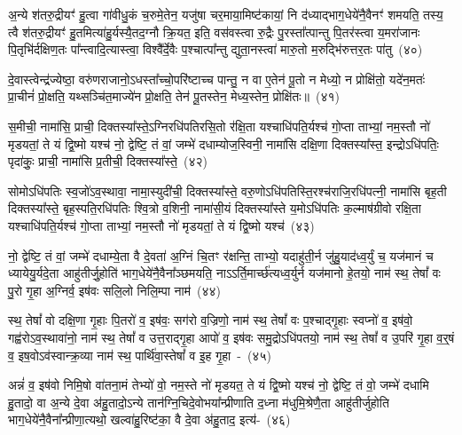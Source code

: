 अ॒न्ये श॑तरु॒द्रीयꣳ॑ हु॒त्वा गा॑वीधु॒कं च॒रुमे॒तेन॒ यजु॑षा चर॒माया॒मिष्ट॑कायां॒ नि द॑ध्याद्भाग॒\-धेये॑नै॒वैनꣳ॑ शमयति॒ तस्य॒ त्वै श॑तरु॒द्रीयꣳ॑ हु॒तमित्या॑हु॒र्यस्यै॒तद॒ग्नौ क्रि॒यत॒ इति॒ वस॑वस्त्वा रु॒द्रैः पु॒रस्ता᳚त्पान्तु पि॒तर॑स्त्वा य॒मरा॑जानः पि॒तृभि॑र्दक्षिण॒तः पा᳚न्त्वादि॒त्यास्त्वा॒ विश्वै᳚र्दे॒वैः प॒श्चात्पा᳚न्तु द्युता॒नस्त्वा॑ मारु॒तो म॒रुद्भि॑रुत्तर॒तः पा॑तु~(४०)\ip

दे॒वास्त्वेन्द्र॑ज्येष्ठा॒ वरु॑णराजानो॒\-ऽधस्ता᳚च्चो॒परि॑ष्टाच्च पान्तु॒ न वा ए॒तेन॑ पू॒तो न मेध्यो॒ न प्रोक्षि॑तो॒ यदे॑न॒मतः॑ प्रा॒चीनं॑ प्रो॒क्षति॒ यथ्सञ्चि॑त॒माज्ये॑न प्रो॒क्षति॒ तेन॑ पू॒तस्तेन॒ मेध्य॒स्तेन॒ प्रोक्षि॑तः॥~(४१)\ip

{\anuvakamend[{दु॒ध्रस्त॒नूर्\mbox{}ह॒विर्भा॑गाः पातु॒ द्वात्रिꣳ॑शच्च}]}

स॒मीची॒ नामा॑सि॒ प्राची॒ दिक्तस्या᳚स्ते॒\-ऽग्नि\-रधि॑\-पतिरसि॒तो र॑क्षि॒ता यश्चाधि॑\-पति॒र्यश्च॑ गो॒प्ता ताभ्यां॒ नम॒स्तौ नो॑ मृडयतां॒ ते यं द्वि॒ष्मो यश्च॑ नो॒ द्वेष्टि॒ तं वां॒ जम्भे॑ दधाम्योज॒स्विनी॒ नामा॑सि दक्षि॒णा दिक्तस्या᳚स्त॒ इन्द्रो\-ऽधि॑\-पतिः॒ पृदा॑कुः॒ प्राची॒ नामा॑सि प्र॒तीची॒ दिक्तस्या᳚स्ते॒~(४२)\ip

सोमो\-ऽधि॑\-पतिः स्व॒जो॑\-ऽव॒स्थावा॒ नामा॒स्युदी॑ची॒ दिक्तस्या᳚स्ते॒ वरु॒णो\-ऽधि॑\-पतिस्ति॒रश्च॑राजि॒रधि॑पत्नी॒ नामा॑सि बृह॒ती दिक्तस्या᳚स्ते॒ बृह॒स्पति॒रधि॑\-पतिः श्वि॒त्रो व॒शिनी॒ नामा॑सी॒यं दिक्तस्या᳚स्ते य॒मो\-ऽधि॑\-पतिः क॒ल्माष॑ग्रीवो रक्षि॒ता यश्चाधि॑\-पति॒र्यश्च॑ गो॒प्ता ताभ्यां॒ नम॒स्तौ नो॑ मृडयतां॒ ते यं द्वि॒ष्मो यश्च॑~(४३)\ip

नो॒ द्वेष्टि॒ तं वां॒ जम्भे॑ दधाम्ये॒ता वै दे॒वता॑ अ॒ग्निं चि॒तꣳ र॑क्षन्ति॒ ताभ्यो॒ यदाहु॑ती॒र्न जु॑हु॒याद॑ध्व॒र्युं च॒ यज॑मानं च ध्यायेयु॒र्यदे॒ता आहु॑तीर्जु॒होति॑ भाग॒\-धेये॑नै॒वैना᳚ञ्छमयति॒ नाऽऽर्ति॒मार्च्छ॑त्यध्व॒र्युर्न यज॑मानो हे॒तयो॒ नाम॑ स्थ॒ तेषां᳚ वः पु॒रो गृ॒हा अ॒ग्निर्व॒ इष॑वः सलि॒लो निलि॒म्पा नाम॑~(४४)\ip

स्थ॒ तेषां᳚ वो दक्षि॒णा गृ॒हाः पि॒तरो॑ व॒ इष॑वः॒ सग॑रो व॒ज्रिणो॒ नाम॑ स्थ॒ तेषां᳚ वः प॒श्चाद्गृ॒हाः स्वप्नो॑ व॒ इष॑वो॒ गह्व॑रो\-ऽव॒स्थावा॑नो॒ नाम॑ स्थ॒ तेषां᳚ व उत्त॒राद्गृ॒हा आपो॑ व॒ इष॑वः समु॒द्रो\-ऽधि॑पतयो॒ नाम॑ स्थ॒ तेषां᳚ व उ॒परि॑ गृ॒हा व॒र्॒\mbox{}षं व॒ इष॒वो\-ऽव॑स्वान्क्र॒व्या नाम॑ स्थ॒ पार्थि॑वा॒स्तेषां᳚ व इ॒ह गृ॒हा~-~(४५)\ip

अन्नं॑ व॒ इष॑वो निमि॒षो वा॑तना॒मं तेभ्यो॑ वो॒ नम॒स्ते नो॑ मृडयत॒ ते यं द्वि॒ष्मो यश्च॑ नो॒ द्वेष्टि॒ तं वो॒ जम्भे॑ दधामि हु॒तादो॒ वा अ॒न्ये दे॒वा अ॑हु॒तादो॒\-ऽन्ये तान॑ग्नि॒चिदे॒वोभया᳚न्प्रीणाति द॒ध्ना म॑धुमि॒श्रेणै॒ता आहु॑तीर्जुहोति भाग॒\-धेये॑नै॒वैना᳚न्प्रीणा॒त्यथो॒ खल्वा॑हु॒रिष्ट॑का॒ वै दे॒वा अ॑हु॒ताद॒ इत्य॑-~(४६)\ip

